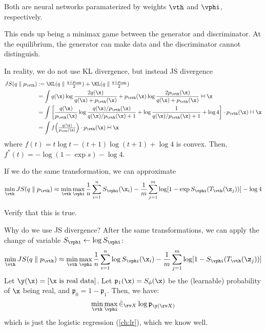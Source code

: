 \documentclass[class=cs480,notes,tikz]{agony}
\begin{document}
Both are neural networks paramaterized by weights $\vth$ and $\vphi$, respectively.

This ends up being a minimax game between the generator and discriminator.
At the equilibrium, the generator can make data and the discriminator cannot distinguish.

In reality, we do not use KL divergence, but instead JS divergence
\begin{align*}
  JS(q \parallel p_{\vth})
   & := \KL(q \parallel \tfrac{q+p_{\vth}}{2}) + \KL(q \parallel \tfrac{q+p_{\vth}}{2})                                                                                     \\
   & = \int q(\x) \log\frac{2q(\x)}{q(\x)+p_{\vth}(\x)} + p_{\vth}(\x)\log\frac{2p_{\vth}(\x)}{q(\x)+p_{\vth}(\x)} \dd{\x}                                                \\
   & = \int \qty[\frac{q(\x)}{p_{\vth}(\x)}\log\frac{q(\x)/p_{\vth}(\x)}{q(\x)/p_{\vth}(\x) + 1} + \log\frac{1}{q(\x)/p_{\vth}(\x)+1} + \log 4]\cdot p_{\vth}(\x) \dd{\x} \\
   & = \int f\qty(\tfrac{q(\x)}{p_{\vth}(\x)}) \cdot p_{\vth}(\x) \dd{\x}
\end{align*}
where $f(t) = t\log t - (t+1)\log(t+1) + \log4$ is convex.
Then, $f^*(t) = -\log(1-\exp s) - \log 4$.

If we do the same transformation, we can approximate
\[
  \min_{\vth} JS(q \parallel p_{\vth})
  \approx \min_{\vth} \max_{\vphi} \frac1n\sum_{i=1}^n S_{\vphi}(\x_i) - \frac1m \sum_{j=1}^m \log[1-\exp S_{\vphi}(T_{\vth}(\z_j))] - \log 4
\]

\begin{xca}
  Verify that this is true.
\end{xca}

Why do we use JS divergence? After the same transformations,
we can apply the change of variable $S_{\vphi} \gets \log S_{\vphi}$:
\[
  \min_{\vth} JS(q \parallel p_{\vth})
  \approx \min_{\vth} \max_{\vphi} \frac1n\sum_{i=1}^n \log S_{\vphi}(\x_i) - \frac1m \sum_{j=1}^m \log[1-S_{\vphi}(T_{\vth}(\z_j))]
\]
Let $\y(\x) = [\text{$\x$ is real data}]$.
Let $\mathfrak{p}_1(\x) = S_{\phi}(\x)$ be the (learnable) probability of $\x$ being real,
and $\mathfrak{p}_0 = 1 - \mathfrak{p}_1$. Then, we have:
\[ \min_{\vth} \max_{\vphi} \hat{\E}_{\rv X}\log \mathfrak{p}_{\y(\rv X)} \]
which is just the logistic regression (\cref{ch:lr}), which we know well.
\end{document}
